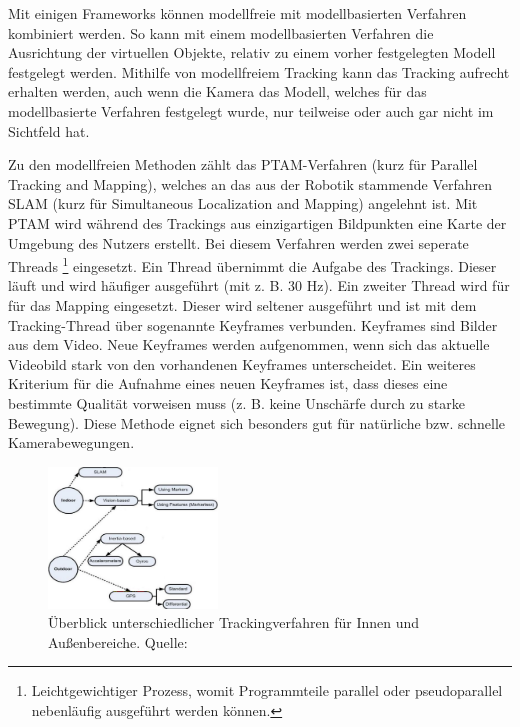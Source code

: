 Mit einigen Frameworks können modellfreie mit modellbasierten Verfahren kombiniert werden. So kann mit einem modellbasierten Verfahren die Ausrichtung der virtuellen Objekte, relativ zu einem vorher festgelegten Modell festgelegt werden. Mithilfe von modellfreiem Tracking kann das Tracking aufrecht erhalten werden, auch wenn die Kamera das Modell, welches für das modellbasierte Verfahren festgelegt wurde, nur teilweise oder auch gar nicht im Sichtfeld hat.

Zu den modellfreien Methoden zählt das PTAM-Verfahren (kurz für  Parallel Tracking and Mapping), welches an das aus der Robotik stammende Verfahren SLAM (kurz für Simultaneous Localization and Mapping) angelehnt ist. \cite{Klein2007} Mit PTAM wird während des Trackings aus einzigartigen Bildpunkten eine Karte der Umgebung des Nutzers erstellt. Bei diesem Verfahren werden zwei seperate Threads \footnote{Leichtgewichtiger Prozess, womit Programmteile parallel oder pseudoparallel nebenläufig ausgeführt werden können.} eingesetzt. Ein Thread übernimmt die Aufgabe des Trackings. Dieser läuft und wird häufiger ausgeführt (mit z. B. 30 Hz). Ein zweiter Thread wird für für das Mapping eingesetzt. Dieser wird seltener ausgeführt und ist mit dem Tracking-Thread über sogenannte Keyframes verbunden. Keyframes sind Bilder aus dem Video. Neue Keyframes werden aufgenommen, wenn sich das aktuelle Videobild stark von den vorhandenen Keyframes unterscheidet. Ein weiteres Kriterium für die Aufnahme eines neuen Keyframes ist, dass dieses eine bestimmte Qualität vorweisen muss (z. B. keine Unschärfe durch zu starke Bewegung). Diese Methode eignet sich besonders gut für natürliche bzw. schnelle Kamerabewegungen.

\begin{figure}[H]
	\centering
	\includegraphics[width=0.4\textwidth]{resources/fundamentals/tracking_technicken.png}
	\caption{Überblick unterschiedlicher Trackingverfahren für Innen und Außenbereiche. Quelle: \cite{Arora2017}}
	\label{img:overviewTrackingMethods}
\end{figure}

